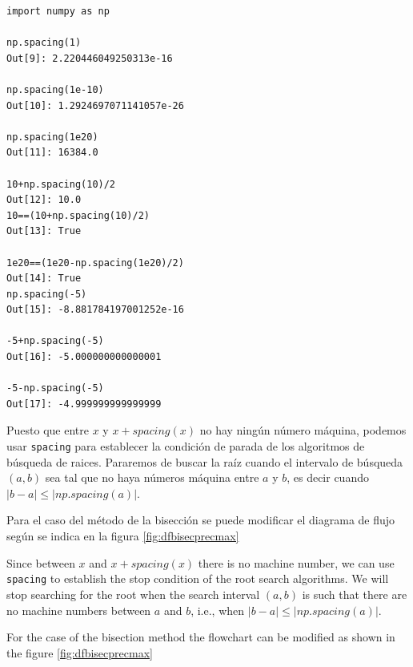 \begin{verbatim}
import numpy as np

np.spacing(1)
Out[9]: 2.220446049250313e-16

np.spacing(1e-10)
Out[10]: 1.2924697071141057e-26

np.spacing(1e20)
Out[11]: 16384.0

10+np.spacing(10)/2
Out[12]: 10.0
10==(10+np.spacing(10)/2)
Out[13]: True

1e20==(1e20-np.spacing(1e20)/2)
Out[14]: True
np.spacing(-5)
Out[15]: -8.881784197001252e-16

-5+np.spacing(-5)
Out[16]: -5.000000000000001

-5-np.spacing(-5)
Out[17]: -4.999999999999999
\end{verbatim}
\begin{paracol}{2}
Puesto que entre $x$ y $x+spacing(x)$ no hay ningún número máquina, podemos usar \texttt{spacing} para establecer la condición de parada de los algoritmos de búsqueda de raices. Pararemos de buscar la raíz cuando el intervalo de búsqueda $(a,b)$ sea tal que no haya números máquina entre $a$ y $b$, es decir cuando $\vert b-a \vert \leq \vert np.spacing(a) \vert$.

Para el caso del método de la bisección se puede modificar el diagrama de flujo según se indica en la figura \ref{fig:dfbisecprecmax}

\switchcolumn
Since between $x$ and $x+spacing(x)$ there is no machine number, we can use \texttt{spacing} to establish the stop condition of the root search algorithms. We will stop searching for the root when the search interval $(a,b)$ is such that there are no machine numbers between $a$ and $b$, i.e., when $\vert b-a \vert \leq \vert np.spacing(a) \vert$.

For the case of the bisection method the flowchart can be modified as shown in the figure \ref{fig:dfbisecprecmax}

\end{paracol}

